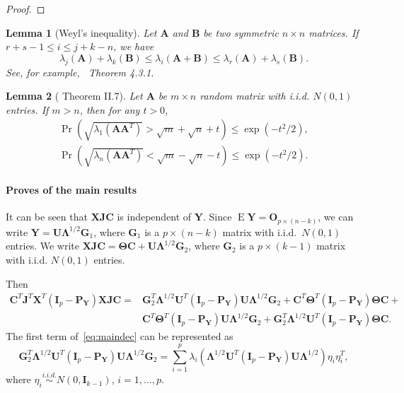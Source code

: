 \documentclass[12pt]{article} %
\DeclareMathOperator{\myE}{E}
\newcommand{\bA}{\mathbf{A}}
\newcommand{\bB}{\mathbf{B}}
\newcommand{\bX}{\mathbf{X}}
\newcommand{\bP}{\mathbf{P}}
\newcommand{\bY}{\mathbf{Y}}
\newcommand{\bG}{\mathbf{G}}
\newcommand{\bJ}{\mathbf{J}}
\newcommand{\bC}{\mathbf{C}}
\newcommand{\bO}{\mathbf{O}}
\newcommand{\bI}{\mathbf{I}}
\newcommand{\bU}{\mathbf{U}}
\newcommand{\bfsym}[1]{\ensuremath{\boldsymbol{#1}}}
\def\bLambda {\bfsym {\Lambda}}
\def\bTheta {\bfsym {\Theta}}
\newtheorem{lemma}{Lemma}
\theoremstyle{definition}
\begin{document}
\begin{appendices}
\begin{proof}
\end{proof}
    \begin{lemma}[Weyl's inequality]
        Let $\bA$ and $\bB$ be two symmetric $n\times n$ matrices. If $r+s-1\leq i \leq j+k-n$, we have
        $$
        \lambda_j(\bA) +\lambda_k(\bB)\leq \lambda_i (\bA+\bB) \leq
        \lambda_r(\bA)+\lambda_s(\bB).
        $$
        See, for example,~\citet{Horn1985Matrix} Theorem 4.3.1.
\end{lemma}
\begin{lemma}[\citet{DAVIDSON2001317} Theorem II.7]\label{DSbound}
    Let $\bA$ be $m\times n$ random matrix with i.i.d. $N(0,1)$ entries.
    If $m>n$, then for any $t>0$,
    \begin{align*}
        \Pr(\sqrt{\lambda_1(\bA \bA^T)}>\sqrt{m}+\sqrt{n}+t)\leq \exp(-t^2/2),\\
        \Pr(\sqrt{\lambda_n(\bA \bA^T)}<\sqrt{m}-\sqrt{n}-t)\leq \exp(-t^2/2).
    \end{align*}
\end{lemma}




\paragraph{Proves of the main results}

It can be seen that $\bX\bJ\bC$ is independent of $\bY$.
Since
$
\myE \bY = \bO_{p\times (n-k)}
$,
we can write
$
\bY = \bU\bLambda^{1/2} \bG_1
$,
where $\bG_1$ is a $p\times (n-k)$ matrix with i.i.d.\ $N(0,1)$ entries.
We write
$
\bX\bJ\bC = \bTheta \bC + \bU\bLambda^{1/2} \bG_2
$, 
where $\bG_2$ is a $p\times (k-1)$ matrix with i.i.d. $N(0,1)$ entries.

Then 
\begin{equation}\label{eq:maindec}
\begin{aligned}
\bC^T\bJ^T \bX^T(\bI_p-\bP_{\bY}) \bX\bJ\bC
=&
\bG_2^T \bLambda^{1/2}\bU^T (\bI_p-\bP_{\bY})\bU\bLambda^{1/2}\bG_2+
 \bC^T \bTheta^T (\bI_p -\bP_{\bY})\bTheta \bC+\\
& \bC^T \bTheta^T (\bI_p -\bP_{\bY})\bU\bLambda^{1/2}\bG_2+
\bG_2^T \bLambda^{1/2}\bU^T (\bI_p-\bP_{\bY})\bTheta \bC.
\end{aligned}
\end{equation}
    The first term of~\eqref{eq:maindec} can be represented as
\begin{equation}\label{eq:firstTerm}
\bG_2^T \bLambda^{1/2}\bU^T (\bI_p-\bP_{\bY})\bU\bLambda^{1/2}\bG_2=
\sum_{i=1}^p \lambda_i (\bLambda^{1/2}\bU^T (\bI_p-\bP_{\bY})\bU\bLambda^{1/2})\eta_i \eta_i^T,
\end{equation}
where $\eta_i\overset{i.i.d.}{\sim} N(0,\bI_{k-1})$, $i=1,\ldots,p$.





\end{appendices}
\end{document}
